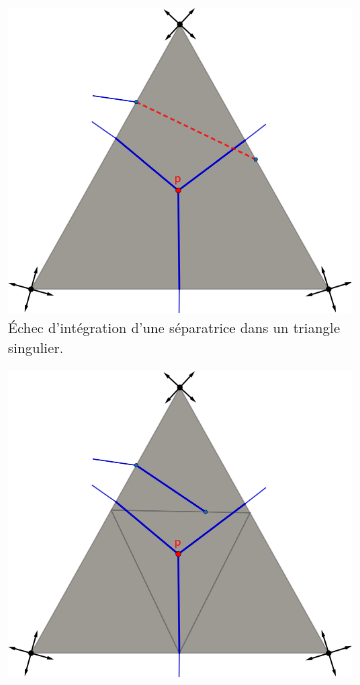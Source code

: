 \begin{figure}[!h]
\centering
\begin{subfigure}[b]{0.495\textwidth}
    \centering
    \includegraphics[width=\textwidth]{images/draw_streams_sing_1.pdf}
    \caption{\'Echec d'intégration d'une séparatrice dans un triangle singulier.}
    \label{fig:draw_streams_sing_1}
\end{subfigure}
\hfill
\begin{subfigure}[b]{0.495\textwidth}
    \centering
    \includegraphics[width=\textwidth]{images/draw_streams_sing_2.pdf}

\end{subfigure}
\end{figure}
